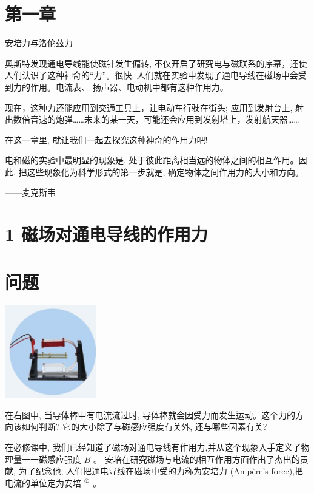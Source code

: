 \documentclass[10pt]{article}
\begin{document}
\section*{第一章}

安培力与洛伦兹力

奥斯特发现通电导线能使磁针发生偏转, 不仅开启了研究电与磁联系的序幕，还使人们认识了这种神奇的“力”。很快, 人们就在实验中发现了通电导线在磁场中会受到力的作用。电流表、 扬声器、电动机中都有这种作用力。

现在，这种力还能应用到交通工具上，让电动车行驶在街头; 应用到发射台上, 射出数倍音速的炮弹……未来的某一天，可能还会应用到发射塔上，发射航天器……

在这一章里, 就让我们一起去探究这种神奇的作用力吧!

电和磁的实验中最明显的现象是, 处于彼此距离相当远的物体之间的相互作用。因此, 把这些现象化为科学形式的第一步就是, 确定物体之间作用力的大小和方向。

——麦克斯韦

\section*{1 磁场对通电导线的作用力}

\section*{问题}

\begin{center}
\includegraphics[max width=0.3\textwidth]{images/01910e72-c5b7-7ed5-a6d4-fb3a5faefc32_7_521053.jpg}
\end{center}

在右图中, 当导体棒中有电流流过时, 导体棒就会因受力而发生运动。这个力的方向该如何判断? 它的大小除了与磁感应强度有关外, 还与哪些因素有关?

在必修课中, 我们已经知道了磁场对通电导线有作用力,并从这个现象入手定义了物理量一一磁感应强度 \(B\) 。 安培在研究磁场与电流的相互作用方面作出了杰出的贡献, 为了纪念他, 人们把通电导线在磁场中受的力称为安培力 (Ampère’s force),把电流的单位定为安培 \({}^{\text{①}}\) 。
\end{document}

